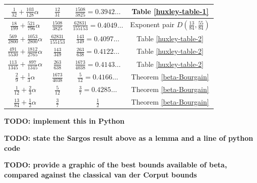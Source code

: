 \begin{table}[ht]
\begin{tabular}{|c|c|c|c|}
    \hline
    $ \frac{1}{32} + \frac{103}{128} \alpha $ & $ \frac{12}{31} $ & $ \frac{1508}{3825} = 0.3942\ldots $ & Table \ref{huxley-table-1}\\
    \hline
    $ \frac{18}{199} + \frac{521}{796} \alpha $ & $ \frac{1508}{3825} $ & $ \frac{62831}{155153} = 0.4049\ldots $ & Exponent pair $D(\frac{13}{84}, \frac{55}{84})$\\
    \hline
    $ \frac{569}{2800} + \frac{1053}{2800} \alpha $ & $ \frac{62831}{155153} $ & $ \frac{143}{349} = 0.4097\ldots $ & Table \ref{huxley-table-2}\\
    \hline
    $ \frac{491}{5530} + \frac{1812}{2765} \alpha $ & $ \frac{143}{349} $ & $ \frac{263}{638} = 0.4122\ldots $ & Table \ref{huxley-table-2}\\
    \hline
    $ \frac{113}{1345} + \frac{897}{1345} \alpha $ & $ \frac{263}{638} $ & $ \frac{1673}{4038} = 0.4143\ldots $ & Table \ref{huxley-table-2}\\
    \hline
    $ \frac{2}{9} + \frac{1}{3} \alpha $ & $ \frac{1673}{4038} $ & $ \frac{5}{12} = 0.4166\ldots $ & Theorem \ref{beta-Bourgain}\\
    \cline{1-3}
    $ \frac{1}{12} + \frac{2}{3} \alpha $ & $ \frac{5}{12} $ & $ \frac{3}{7} = 0.4285\ldots $ & Theorem \ref{beta-Bourgain}\\
    \cline{1-3}
    $ \frac{13}{84} + \frac{1}{2} \alpha $ & $ \frac{3}{7} $ & $ \frac{1}{2}$ & Theorem \ref{beta-Bourgain}\\
    \hline
    \end{tabular}
    \label{huxley_table_ranges}
    \end{table}

{\bf TODO: implement this in Python}

{\bf TODO: state the Sargos result above as a lemma and a line of python code}

{\bf TODO: provide a graphic of the best bounds available of beta, compared against the classical van der Corput bounds}
